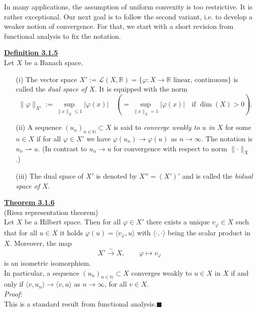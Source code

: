 In many applications, the assumption of uniform convexity is too restrictive. It is rather exceptional. Our next goal is to follow the second variant, i.e. to develop a weaker notion of convergence. For that, we start with a short revision from functional analysis to fix the notation.\newpage

\textbf{\underline{Definition 3.1.5}}\\
Let $X$ be a Banach space.
\begin{itemize}
	\item[(i)] The vector space $X':=\mathcal{L}(X,\mathbb{R})=\{\varphi:X\longrightarrow\mathbb{R}\text{ linear, continuous}\}$ is called the \textit{dual space of $X$}. It is equipped with the norm
	\[\lVert\varphi\rVert_{X'}:=\sup_{\lVert x\rVert_X\leq1}{\lvert\varphi(x)\rvert}\quad\left(=\sup_{\lVert x\rVert_X=1}{\lvert\varphi(x)\rvert}\quad\text{if }\dim(X)>0\right).\]
	\item[(ii)] A sequence $(u_n)_{n\in\mathbb{N}}\subset X$ is said to \textit{converge weakly to $u$ in $X$} for some $u\in X$ if for all $\varphi\in X'$ we have $\varphi(u_n)\to\varphi(u)$ as $n\to\infty$. The notation is $u_n\rightharpoonup u$. (In contrast to $u_n\to u$ for convergence with respect to norm $\lVert\cdot\rVert_X$.)
	\item[(iii)] The dual space of $X'$ is denoted by $X''=(X')'$ and is called the \textit{bidual space of $X$}.\\[11pt]
\end{itemize}

\textbf{\underline{Theorem 3.1.6}}\\
(Riesz representation theorem)\\
Let $X$ be a Hilbert space. Then for all $\varphi\in X'$ there exists a unique $v_\varphi\in X$ such that for all $u\in X$ it holds $\varphi(u)=\langle v_\varphi,u\rangle$ with $\langle\cdot,\cdot\rangle$ being the scalar product in $X$. Moreover, the map
\[X'\overset{\sim}{\longrightarrow}X,\qquad\varphi\longmapsto v_\varphi\]
is an isometric isomorphism.\\

In particular, a sequence $(u_n)_{n\in\mathbb{N}}\subset X$ converges weakly to $u\in X$ in $X$ if and only if $\langle v,u_n\rangle\to\langle v,u\rangle$ as $n\to\infty$, for all $v\in X$.\\

\textit{Proof:}\\
This is a standard result from functional analysis.\hfill$\blacksquare$\\[11pt]

